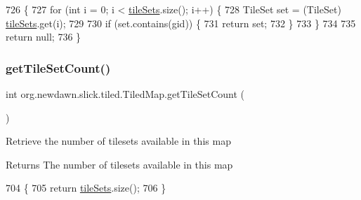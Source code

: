 \begin{DoxyCode}
726                                             \{
727         \textcolor{keywordflow}{for} (\textcolor{keywordtype}{int} i = 0; i < \mbox{\hyperlink{classorg_1_1newdawn_1_1slick_1_1tiled_1_1_tiled_map_a4fd72e23a7aaf6f85905f4bf78e2ce5f}{tileSets}}.size(); i++) \{
728             TileSet \textcolor{keyword}{set} = (TileSet) \mbox{\hyperlink{classorg_1_1newdawn_1_1slick_1_1tiled_1_1_tiled_map_a4fd72e23a7aaf6f85905f4bf78e2ce5f}{tileSets}}.get(i);
729 
730             \textcolor{keywordflow}{if} (\textcolor{keyword}{set}.contains(gid)) \{
731                 \textcolor{keywordflow}{return} \textcolor{keyword}{set};
732             \}
733         \}
734 
735         \textcolor{keywordflow}{return} null;
736     \}
\end{DoxyCode}
\mbox{\label{classorg_1_1newdawn_1_1slick_1_1tiled_1_1_tiled_map_a349e3cf63beff71c33ae39a451dff398}} 
\subsubsection{\texorpdfstring{get\+Tile\+Set\+Count()}{getTileSetCount()}}
{\footnotesize\ttfamily int org.\+newdawn.\+slick.\+tiled.\+Tiled\+Map.\+get\+Tile\+Set\+Count (\begin{DoxyParamCaption}{ }\end{DoxyParamCaption})\hspace{0.3cm}{\ttfamily [inline]}}

Retrieve the number of tilesets available in this map

\begin{DoxyReturn}{Returns}
The number of tilesets available in this map 
\end{DoxyReturn}

\begin{DoxyCode}
704                                  \{
705         \textcolor{keywordflow}{return} \mbox{\hyperlink{classorg_1_1newdawn_1_1slick_1_1tiled_1_1_tiled_map_a4fd72e23a7aaf6f85905f4bf78e2ce5f}{tileSets}}.size();
706     \}
\end{DoxyCode}
\mbox{\label{classorg_1_1newdawn_1_1slick_1_1tiled_1_1_tiled_map_adecd3ac79ebd72721187e7646d783782}} 
